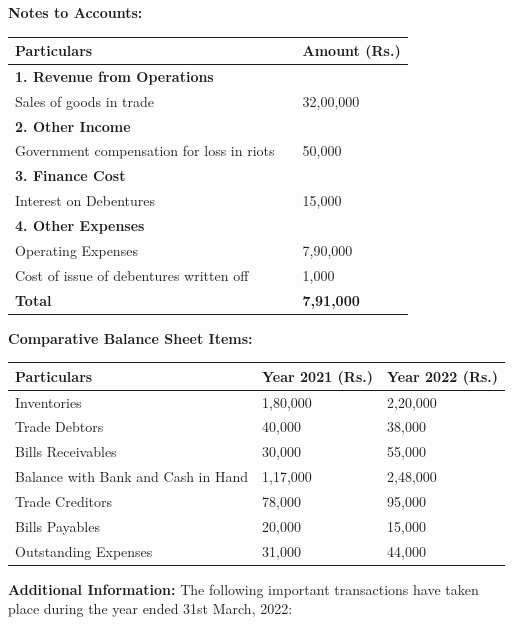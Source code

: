 \documentclass[11pt,a4paper]{article}
\begin{document}
\begin{center}
   \textbf{Notes to Accounts:}
\vskip 5pt

\begin{tabular}{lll}
  \hline
  Particulars & & Amount (Rs.) \\
  \hline
   \textbf{1. Revenue from Operations} & & \\
  \quad Sales of goods in trade & & 32,00,000 \\
  \hline
   \textbf{2. Other Income} & & \\
  \quad Government compensation for loss in riots & & 50,000 \\
  \hline
   \textbf{3. Finance Cost} & & \\
  \quad Interest on Debentures & & 15,000 \\
  \hline
   \textbf{4. Other Expenses} & & \\
  \quad Operating Expenses & & 7,90,000 \\
  \quad Cost of issue of debentures written off & & 1,000 \\
   \textbf{Total} & &   \textbf{7,91,000} \\
  \hline
\end{tabular}
\end{center}


\newpage

\begin{center}
   \textbf{Comparative Balance Sheet Items:}
\vskip 5pt

\begin{tabular}{lll}
  \hline
  Particulars & Year 2021 (Rs.) & Year 2022 (Rs.) \\
  \hline
  Inventories & 1,80,000 & 2,20,000 \\
  Trade Debtors & 40,000 & 38,000 \\
  Bills Receivables & 30,000 & 55,000 \\
  Balance with Bank and Cash in Hand & 1,17,000 & 2,48,000 \\
  Trade Creditors & 78,000 & 95,000 \\
  Bills Payables & 20,000 & 15,000 \\
  Outstanding Expenses & 31,000 & 44,000 \\
  \hline
\end{tabular}
\end{center}

   \textbf{Additional Information:}
The following important transactions have taken place during the year ended 31st March, 2022:
\end{document}
